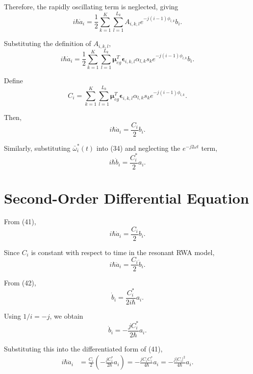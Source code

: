 \documentclass[12pt,a4paper]{article}
\begin{document}
Therefore, the rapidly oscillating term is neglected, giving
\begin{equation}
\boxed{
i\hbar\dot a_i
=
\frac{1}{2}
\sum_{k=1}^{K}
\sum_{l=1}^{L_k}
A_{i,k,l}
e^{-j(i-1)\phi_{l,k}}
b_i.
}
\tag{39}
\end{equation}

Substituting the definition of \(A_{i,k,l}\),
\[
i\hbar\dot a_i
=
\frac{1}{2}
\sum_{k=1}^{K}
\sum_{l=1}^{L_k}
\boldsymbol{\mu}_{eg}^{T}
\boldsymbol{\epsilon}_{i,k,l}
\alpha_{l,k}s_k
e^{-j(i-1)\phi_{l,k}}
b_i.
\]

Define
\begin{equation}
\boxed{
C_i
=
\sum_{k=1}^{K}
\sum_{l=1}^{L_k}
\boldsymbol{\mu}_{eg}^{T}
\boldsymbol{\epsilon}_{i,k,l}
\alpha_{l,k}s_k
e^{-j(i-1)\phi_{l,k}}.
}
\tag{40}
\end{equation}

Then,
\begin{equation}
\boxed{
i\hbar\dot a_i
=
\frac{C_i}{2}b_i.
}
\tag{41}
\end{equation}

Similarly, substituting $\bar\omega_i^*(t)$ into (34) and neglecting
the $e^{-j2\omega t}$ term,
\begin{equation}
\boxed{
i\hbar\dot b_i
=
\frac{C_i^{*}}{2}a_i.
}
\tag{42}
\end{equation}

\section{Second-Order Differential Equation}

From (41),
\[
i\hbar\dot a_i
=
\frac{C_i}{2}b_i.
\]

Since \(C_i\) is constant with respect to time in the resonant
RWA model,
\[
i\hbar\ddot a_i
=
\frac{C_i}{2}\dot b_i.
\]

From (42),
\[
\dot b_i
=
\frac{C_i^{*}}{2i\hbar}a_i.
\]

Using
\(1/i=-j\),
we obtain
\[
\dot b_i
=
-\frac{jC_i^{*}}{2\hbar}a_i.
\]

Substituting this into the differentiated form of (41),
\[
\begin{aligned}
i\hbar\ddot a_i
&=
\frac{C_i}{2}
\left(
-\frac{jC_i^{*}}{2\hbar}a_i
\right)
=
-\frac{jC_iC_i^{*}}{4\hbar}a_i
=
-\frac{j|C_i|^2}{4\hbar}a_i.
\end{aligned}
\]
\end{document}
